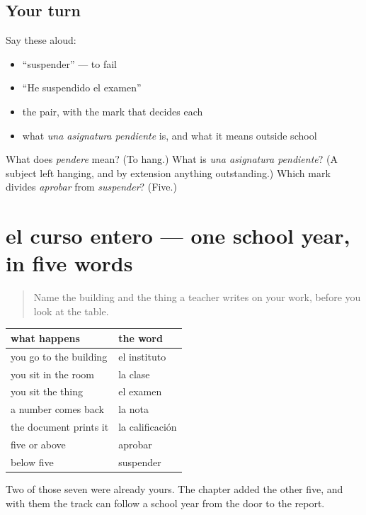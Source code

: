 \subsection*{Your turn}
Say these aloud:

\begin{itemize}
\raggedright
  \item \textquotedblleft{}suspender\textquotedblright{} — to fail
  \item \textquotedblleft{}He suspendido el examen\textquotedblright{}
  \item the pair, with the mark that decides each
  \item what \emph{una asignatura pendiente} is, and what it means outside school
\end{itemize}

\begin{tcolorbox}[breakable,colback=teal!4,colframe=teal!35!black,title={Before you move on}]
What does \emph{pendere} mean? (To hang.) What is \emph{una asignatura pendiente}? (A subject left hanging, and by extension anything outstanding.) Which mark divides \emph{aprobar} from \emph{suspender}? (Five.)
\end{tcolorbox}
\section[el curso entero]{el curso entero — one school year, in five words}

\label{lesson:ES-C429-repaso-notas}



\begin{quote}
Name the building and the thing a teacher writes on your work, before you look at the table.
\end{quote}

\begin{grammarlens}[title={Grammar Lens: the year, in order}]
\noindent
\begin{tabularx}{\linewidth}{@{}>{\raggedright\arraybackslash}X>{\raggedright\arraybackslash}X@{}}
\toprule
\textbf{what happens} & \textbf{the word} \\
\midrule
you go to the building & el instituto \\
you sit in the room & la clase \\
you sit the thing & el examen \\
a number comes back & la nota \\
the document prints it & la calificación \\
five or above & aprobar \\
below five & suspender \\
\bottomrule
\end{tabularx}

Two of those seven were already yours. The chapter added the other five, and with them the track can follow a school year from the door to the report.
\end{grammarlens}

